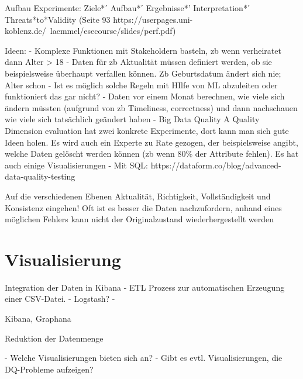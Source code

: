 Aufbau Experimente: 
Ziele*ʹ Aufbau*ʹ Ergebnisse*' Interpretation*ʹ Threats*to*Validity
(Seite 93 https://userpages.uni-koblenz.de/~laemmel/esecourse/slides/perf.pdf)


Ideen:
- Komplexe Funktionen mit Stakeholdern basteln, zb wenn verheiratet dann Alter > 18
- Daten für zb Aktualität müssen definiert werden, ob sie beispielsweise überhaupt verfallen können. Zb Geburtsdatum ändert sich nie; Alter schon
- Ist es möglich solche Regeln mit HIlfe von ML abzuleiten oder funktioniert das gar nicht? 
- Daten vor einem Monat berechnen, wie viele sich ändern müssten (aufgrund von zb Timeliness, correctness) und dann nachschauen wie viele sich tatsächlich geändert haben
- Big Data Quality A Quality Dimension evaluation hat zwei konkrete Experimente, dort kann man sich gute Ideen holen. Es wird auch ein Experte zu Rate gezogen, der beispielsweise angibt, welche Daten gelöscht werden können (zb wenn 80\% der Attribute fehlen). Es hat auch einige Visualisierungen 
- Mit SQL: 
https://dataform.co/blog/advanced-data-quality-testing




Auf die verschiedenen Ebenen Aktualität, Richtigkeit, Vollständigkeit und Konsistenz eingehen!
Oft ist es besser die Daten nachzufordern, anhand eines möglichen Fehlers kann nicht der Originalzustand wiederhergestellt werden

\section{Visualisierung}


Integration der Daten in Kibana
- ETL Prozess zur automatischen Erzeugung einer CSV-Datei.
- Logstash?
- 

Kibana, Graphana

Reduktion der Datenmenge



- Welche Visualisierungen bieten sich an?
- Gibt es evtl. Visualisierungen, die DQ-Probleme aufzeigen?


